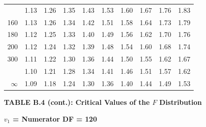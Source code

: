 \documentclass[10pt]{article}
\begin{document}
\begin{longtable}{@{}r!{\vrule width 0.8pt\hspace{0.55em}}rrrrrrrrr@{}}
 & 1.13 & 1.26 & 1.35 & 1.43 & 1.53 & 1.60 & 1.67 & 1.76 & 1.83 \\
160 & 1.13 & 1.26 & 1.34 & 1.42 & 1.51 & 1.58 & 1.64 & 1.73 & 1.79 \\
180 & 1.12 & 1.25 & 1.33 & 1.40 & 1.49 & 1.56 & 1.62 & 1.70 & 1.76 \\
200 & 1.12 & 1.24 & 1.32 & 1.39 & 1.48 & 1.54 & 1.60 & 1.68 & 1.74 \\
300 & 1.11 & 1.22 & 1.30 & 1.36 & 1.44 & 1.50 & 1.55 & 1.62 & 1.67 \\
 & 1.10 & 1.21 & 1.28 & 1.34 & 1.41 & 1.46 & 1.51 & 1.57 & 1.62 \\
$\infty$ & 1.09 & 1.18 & 1.24 & 1.30 & 1.36 & 1.40 & 1.44 & 1.49 & 1.53 \\
\end{longtable}
\newpage
\thispagestyle{empty}
\begin{center}
{\large\bfseries TABLE B.4 (cont.): Critical Values of the $F$ Distribution\par}
\end{center}
{\large\bfseries $v_1$ = Numerator DF = 120\par}
\vspace{0.5em}
\small
\end{document}
